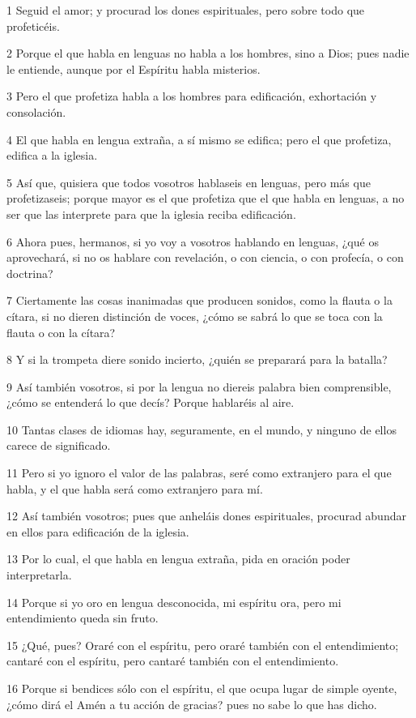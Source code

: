 \par 1 Seguid el amor; y procurad los dones espirituales, pero sobre todo que profeticéis.
\par 2 Porque el que habla en lenguas no habla a los hombres, sino a Dios; pues nadie le entiende, aunque por el Espíritu habla misterios.
\par 3 Pero el que profetiza habla a los hombres para edificación, exhortación y consolación.
\par 4 El que habla en lengua extraña, a sí mismo se edifica; pero el que profetiza, edifica a la iglesia.
\par 5 Así que, quisiera que todos vosotros hablaseis en lenguas, pero más que profetizaseis; porque mayor es el que profetiza que el que habla en lenguas, a no ser que las interprete para que la iglesia reciba edificación.
\par 6 Ahora pues, hermanos, si yo voy a vosotros hablando en lenguas, ¿qué os aprovechará, si no os hablare con revelación, o con ciencia, o con profecía, o con doctrina?
\par 7 Ciertamente las cosas inanimadas que producen sonidos, como la flauta o la cítara, si no dieren distinción de voces, ¿cómo se sabrá lo que se toca con la flauta o con la cítara?
\par 8 Y si la trompeta diere sonido incierto, ¿quién se preparará para la batalla?
\par 9 Así también vosotros, si por la lengua no diereis palabra bien comprensible, ¿cómo se entenderá lo que decís? Porque hablaréis al aire.
\par 10 Tantas clases de idiomas hay, seguramente, en el mundo, y ninguno de ellos carece de significado.
\par 11 Pero si yo ignoro el valor de las palabras, seré como extranjero para el que habla, y el que habla será como extranjero para mí.
\par 12 Así también vosotros; pues que anheláis dones espirituales, procurad abundar en ellos para edificación de la iglesia.
\par 13 Por lo cual, el que habla en lengua extraña, pida en oración poder interpretarla.
\par 14 Porque si yo oro en lengua desconocida, mi espíritu ora, pero mi entendimiento queda sin fruto.
\par 15 ¿Qué, pues? Oraré con el espíritu, pero oraré también con el entendimiento; cantaré con el espíritu, pero cantaré también con el entendimiento.
\par 16 Porque si bendices sólo con el espíritu, el que ocupa lugar de simple oyente, ¿cómo dirá el Amén a tu acción de gracias? pues no sabe lo que has dicho.
